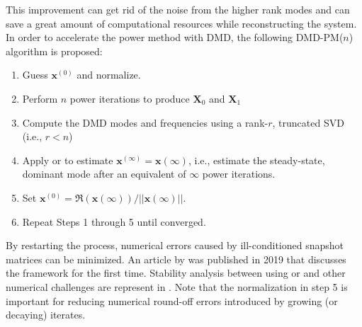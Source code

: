This improvement can get rid of the noise from the higher rank modes and can save a great amount of computational resources while reconstructing the system.
In order to accelerate the power method with DMD, the following DMD-PM($n$) algorithm is proposed:
\begin{enumerate}
 \item Guess $\mathbf{x}^{(0)}$ and normalize.
 \item Perform $n$ power iterations to produce $\mathbf{X}_0$ and $\mathbf{X}_1$
 \item Compute the DMD modes and frequencies using a rank-$r$, truncated  SVD (i.e., $r < n$)
 \item Apply  or  to estimate $\mathbf{x}^{(\infty)}=\mathbf{x}(\infty)$, i.e., estimate the steady-state, dominant mode after an equivalent of $\infty$ power iterations.
 \item Set $\mathbf{x}^{(0)} = \Re(\mathbf{x}(\infty)) / ||\mathbf{x}(\infty)||$.  
 \item Repeat Steps 1 through 5 until converged.
\end{enumerate}
By restarting the process, numerical errors caused by ill-conditioned snapshot matrices can be minimized.
An article by \citet{roberts2019acceleration} was published in 2019 that discusses the framework for the first time.
Stability analysis between using  or  and other numerical challenges are represent in .
Note that the normalization in step 5 is important for reducing numerical round-off errors introduced by growing (or decaying) iterates.

